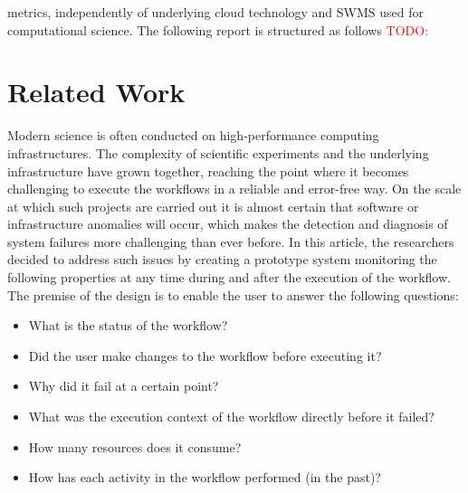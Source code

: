 \documentclass[lettersize,journal]{IEEEtran}
\newcommand{\todo}[1]{\textcolor{red}{TODO: #1}\PackageWarning{TODO:}{#1!}}
\begin{document}
metrics, independently of underlying cloud technology and SWMS used for computational science. The following report is structured as follows \todo{}


\section{Related Work}
Modern science is often conducted on high-performance computing infrastructures. The complexity of scientific experiments and the underlying infrastructure have grown together, reaching the point where it becomes challenging to execute the workflows in a reliable and error-free way. On the scale at which such projects are carried out it is almost certain that software or infrastructure anomalies will occur, which makes the detection and diagnosis of system failures more challenging than ever before. In this article\cite{captureWorkflow}, the researchers decided to address such issues by creating a prototype system monitoring the following properties at any time during and after the execution of the workflow. The premise of the design is to enable the user to answer the following questions:

\begin{itemize}
  \item What is the status of the workflow?
  \item Did the user make changes to the workflow
before executing it?
  \item Why did it fail at a certain point?
  \item What was the execution context of the
workflow directly before it failed?
  \item How many resources does it consume?
  \item How has each activity in the workflow
performed (in the past)?
\end{itemize}
\end{document}
